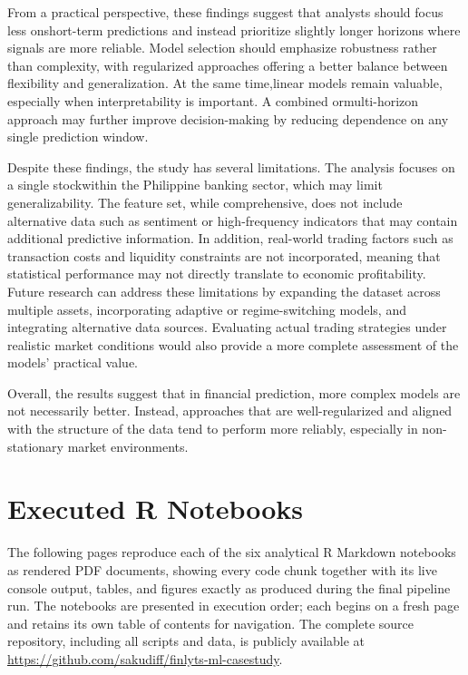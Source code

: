 \documentclass[12pt]{article}
\begin{document}
From a practical perspective, these findings suggest that analysts should focus less onshort-term predictions and instead prioritize slightly longer horizons where signals are more reliable. Model selection should emphasize robustness rather than complexity, with regularized approaches offering a better balance between flexibility and generalization. At the same time,linear models remain valuable, especially when interpretability is important. A combined ormulti-horizon approach may further improve decision-making by reducing dependence on any single prediction window.

Despite these findings, the study has several limitations. The analysis focuses on a single stockwithin the Philippine banking sector, which may limit generalizability. The feature set, while comprehensive, does not include alternative data such as sentiment or high-frequency indicators that may contain additional predictive information. In addition, real-world trading factors such as transaction costs and liquidity constraints are not incorporated, meaning that statistical performance may not directly translate to economic profitability. Future research can address these limitations by expanding the dataset across multiple assets, incorporating adaptive or regime-switching models, and integrating alternative data sources. Evaluating actual trading strategies under realistic market conditions would also provide a more complete assessment of the models' practical value.

Overall, the results suggest that in financial prediction, more complex models are not necessarily better. Instead, approaches that are well-regularized and aligned with the structure of the data tend to perform more reliably, especially in non-stationary market environments.


\printbibliography[title={References}]

\newpage
\appendix

\newpage
\section{Executed R Notebooks} \label{sec:appendix_notebooks}

The following pages reproduce each of the six analytical R Markdown notebooks
as rendered PDF documents, showing every code chunk together with its live
console output, tables, and figures exactly as produced during the final
pipeline run.  The notebooks are presented in execution order; each begins on
a fresh page and retains its own table of contents for navigation.
The complete source repository, including all scripts and data, is publicly
available at \url{https://github.com/sakudiff/finlyts-ml-casestudy}.
\end{document}
